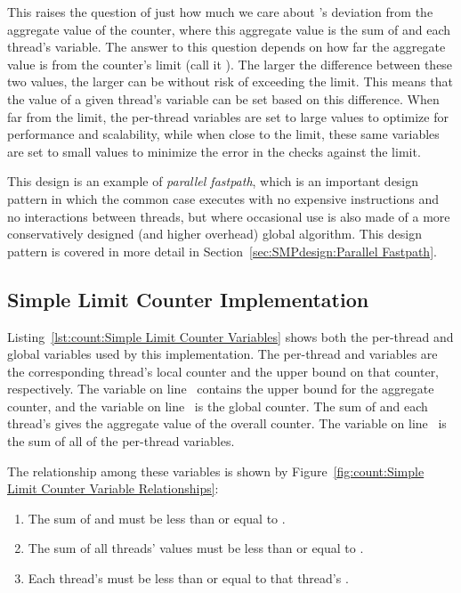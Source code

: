 This raises the question of just how much we care about 's
deviation from the aggregate value of the counter, where this aggregate value
is the sum of  and each thread's  variable.
The answer to this question depends on how far the aggregate value is
from the counter's limit (call it ).
The larger the difference between these two values, the larger 
can be without risk of exceeding the  limit.
This means that the
value of a given thread's  variable can be set
based on this difference.
When far from the limit, the  per-thread variables are
set to large values to optimize for performance and scalability, while
when close to the limit, these same variables are set to small values
to minimize the error in the checks against the  limit.

This design is an example of \emph{parallel fastpath}, which is an important
design pattern in which the common case executes with no expensive
instructions and no interactions between threads, but where occasional
use is also made of a more conservatively designed
(and higher overhead) global algorithm.
This design pattern is covered in more detail in
Section~\ref{sec:SMPdesign:Parallel Fastpath}.

\subsection{Simple Limit Counter Implementation}
\label{sec:count:Simple Limit Counter Implementation}

\begin{fcvref}
Listing~\ref{lst:count:Simple Limit Counter Variables}
shows both the per-thread and global variables used by this
implementation.
The per-thread  and  variables are the
corresponding thread's local counter and the upper bound on that
counter, respectively.
The  variable on
line~ contains the upper
bound for the aggregate counter, and the  variable
on line~ is the global counter.
The sum of  and each thread's  gives
the aggregate value of the overall counter.
The  variable on
line~ is the sum of all of the
per-thread  variables.
\end{fcvref}
The relationship among these variables is shown by
Figure~\ref{fig:count:Simple Limit Counter Variable Relationships}:
\begin{enumerate}
\item	The sum of  and  must
	be less than or equal to .
\item	The sum of all threads'  values must be
	less than or equal to .
\item	Each thread's  must be less than or equal to
	that thread's .
\end{enumerate}

